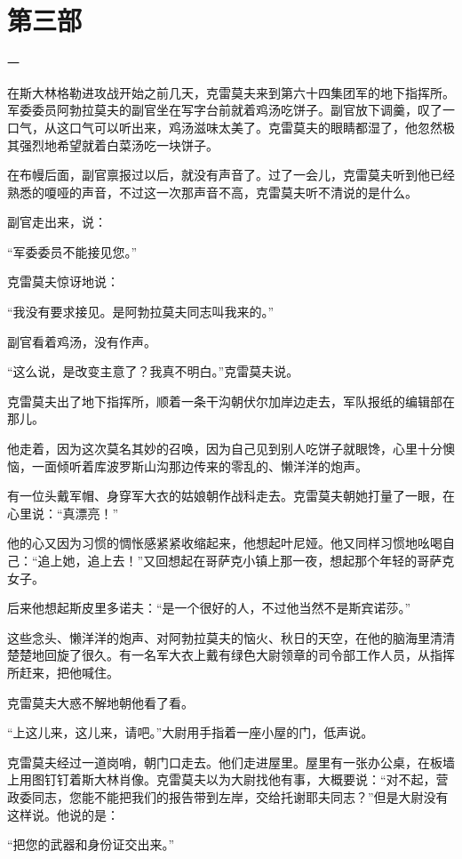 
\section{ 第三部}


一

在斯大林格勒进攻战开始之前几天，克雷莫夫来到第六十四集团军的地下指挥所。军委委员阿勃拉莫夫的副官坐在写字台前就着鸡汤吃饼子。副官放下调羹，叹了一口气，从这口气可以听出来，鸡汤滋味太美了。克雷莫夫的眼睛都湿了，他忽然极其强烈地希望就着白菜汤吃一块饼子。

在布幔后面，副官禀报过以后，就没有声音了。过了一会儿，克雷莫夫听到他已经熟悉的嗄哑的声音，不过这一次那声音不高，克雷莫夫听不清说的是什么。

副官走出来，说：

“军委委员不能接见您。”

克雷莫夫惊讶地说：

“我没有要求接见。是阿勃拉莫夫同志叫我来的。”

副官看着鸡汤，没有作声。

“这么说，是改变主意了？我真不明白。”克雷莫夫说。

克雷莫夫出了地下指挥所，顺着一条干沟朝伏尔加岸边走去，军队报纸的编辑部在那儿。

他走着，因为这次莫名其妙的召唤，因为自己见到别人吃饼子就眼馋，心里十分懊恼，一面倾听着库波罗斯山沟那边传来的零乱的、懒洋洋的炮声。

有一位头戴军帽、身穿军大衣的姑娘朝作战科走去。克雷莫夫朝她打量了一眼，在心里说：“真漂亮！”

他的心又因为习惯的惆怅感紧紧收缩起来，他想起叶尼娅。他又同样习惯地吆喝自己：“追上她，追上去！”又回想起在哥萨克小镇上那一夜，想起那个年轻的哥萨克女子。

后来他想起斯皮里多诺夫：“是一个很好的人，不过他当然不是斯宾诺莎。”

这些念头、懒洋洋的炮声、对阿勃拉莫夫的恼火、秋日的天空，在他的脑海里清清楚楚地回旋了很久。有一名军大衣上戴有绿色大尉领章的司令部工作人员，从指挥所赶来，把他喊住。

克雷莫夫大惑不解地朝他看了看。

“上这儿来，这儿来，请吧。”大尉用手指着一座小屋的门，低声说。

克雷莫夫经过一道岗哨，朝门口走去。他们走进屋里。屋里有一张办公桌，在板墙上用图钉钉着斯大林肖像。克雷莫夫以为大尉找他有事，大概要说：“对不起，营政委同志，您能不能把我们的报告带到左岸，交给托谢耶夫同志？”但是大尉没有这样说。他说的是：

“把您的武器和身份证交出来。”

